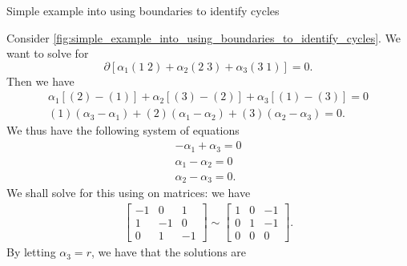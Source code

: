 \documentclass[notoc,notitlepage]{tufte-book}
\begin{document}
\begin{eg}\label{eg:finding_the_number_of_cycles}
  \begin{marginfigure}
    \centering
    \caption{Simple example into using boundaries to identify cycles}\label{fig:simple_example_into_using_boundaries_to_identify_cycles}
  \end{marginfigure}
  Consider \cref{fig:simple_example_into_using_boundaries_to_identify_cycles}.
  We want to solve for
  \begin{equation*}
    \partial [ \alpha_1 (1 \; 2) + \alpha_2 (2 \; 3) + \alpha_3 (3 \; 1) ] = 0.
  \end{equation*}
  Then we have
  \begin{gather*}
    \alpha_1 [(2) - (1)] + \alpha_2 [(3) - (2)] + \alpha_3 [(1) - (3)] = 0 \\
    (1) (\alpha_3 - \alpha_1) + (2) (\alpha_1 - \alpha_2) + (3) (\alpha_2 -
    \alpha_3) = 0.
  \end{gather*}
  We thus have the following system of equations
  \begin{gather*}
    -\alpha_1 + \alpha_3 = 0 \\
    \alpha_1 - \alpha_2 = 0 \\
    \alpha_2 - \alpha_3 = 0.
  \end{gather*}
  We shall solve for this using  on matrices: we have
  \begin{align*}
    \begin{bmatrix}
      -1 & 0 & 1 \\
      1 & -1 & 0 \\
      0 & 1 & -1
    \end{bmatrix} \sim
    \begin{bmatrix}
      1 & 0 & -1 \\
      0 & 1 & -1 \\
      0 & 0 & 0
    \end{bmatrix}.
  \end{align*}
  By letting $\alpha_3 = r$, we have that the solutions are

\end{eg}
\end{document}
